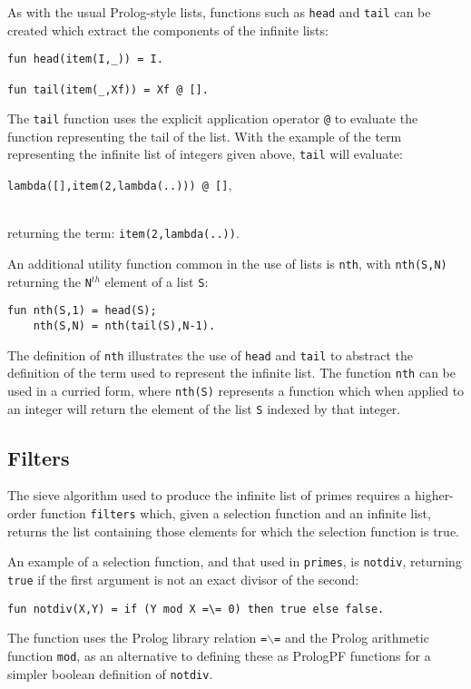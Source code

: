 As with the usual Prolog-style lists, functions such as \texttt{head} and
\texttt{tail} can be created which extract the
components of the infinite lists:
\begin{verbatim}
fun head(item(I,_)) = I.

fun tail(item(_,Xf)) = Xf @ [].
\end{verbatim}
The \texttt{tail} function uses the explicit application operator \texttt{@} to
evaluate the function representing the tail of the list.  With the example
of the term representing the infinite list of integers given above, \texttt{tail}
will evaluate:\\
\centerline{\texttt{lambda([],item(2,lambda(..))) @ []},}\\
returning the term: \texttt{item(2,lambda(..))}.

An additional utility function common in the use of lists is \texttt{nth},
with \texttt{nth(S,N)} returning
the \texttt{N}$^{th}$ element of a list \texttt{S}:
\begin{verbatim}
fun nth(S,1) = head(S);
    nth(S,N) = nth(tail(S),N-1).
\end{verbatim}
The definition of \texttt{nth} illustrates the use of \texttt{head} and \texttt{tail}
to abstract the definition of the term used to represent the infinite list.  The
function \texttt{nth} can be used in a curried form, where \texttt{nth(S)} represents
a function which when applied to an integer will return the element of the list \texttt{S}
indexed by that integer.

\subsection{Filters}

The sieve algorithm used to produce the infinite list of primes requires a 
higher-order function
\texttt{filters} which, given a selection function and an infinite list, returns
the list containing those elements for which the selection function is true.

An example of a selection function, and that used in \texttt{primes}, is
\texttt{notdiv}, returning \texttt{true} if the first argument is not an exact
divisor of the second:
\begin{verbatim}
fun notdiv(X,Y) = if (Y mod X =\= 0) then true else false.
\end{verbatim}
The function uses the Prolog library relation \texttt{=$\backslash$=} and the
Prolog arithmetic function \texttt{mod}, as an alternative to defining these as
PrologPF functions for a simpler boolean definition of \texttt{notdiv}.

